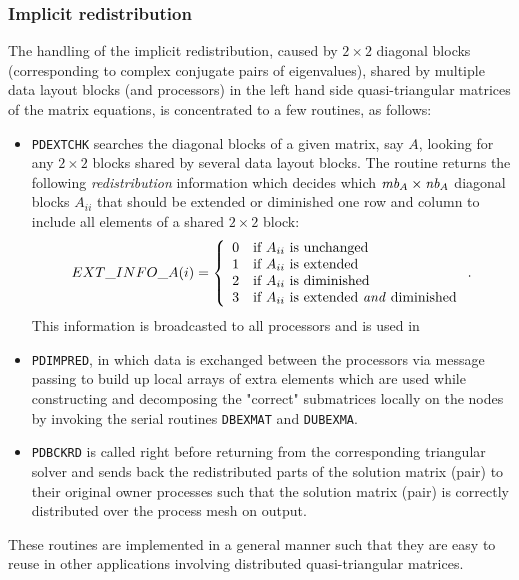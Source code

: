 \documentclass[11pt]{article}
\begin{document}
\subsubsection{Implicit redistribution}
The handling of the implicit redistribution, caused by $2 \times
2$ diagonal blocks (corresponding to complex conjugate pairs
of eigenvalues), shared by multiple data layout blocks
(and processors) in the
left hand side quasi-triangular matrices of the matrix equations,
is concentrated to a few routines, as follows:
%
\begin{itemize}
    \item \texttt{PDEXTCHK} searches the diagonal
    blocks of a given matrix, say $A$, looking for any $2 \times 2$
    blocks shared by several data layout blocks. The routine returns the
    following {\em redistribution}
    information which decides which $\mbox{\em mb}_A \times \mbox{\em
    nb}_A$ diagonal blocks $A_{ii}$ that should be extended or diminished
    one row and column to include all elements of a shared $2 \times 2$
    block:
    \begin{displaymath}
        EXT\_INFO\_A(i) =
        \left\{ \begin{array}{ll}
        0 & \textrm{if $A_{ii}$ is unchanged} \\
        1 & \textrm{if $A_{ii}$ is extended} \\
        2 & \textrm{if $A_{ii}$ is diminished} \\
        3 & \textrm{if $A_{ii}$ is extended \emph{and} diminished}
        \end{array} \right. .
    \end{displaymath}
    This information is broadcasted to all processors and is used in
    \item \texttt{PDIMPRED}, in which data is exchanged between the
    processors via message passing to build up local arrays of extra elements which
    are used while constructing and decomposing the "correct"
    submatrices locally on the nodes by invoking the serial routines
    \texttt{DBEXMAT} and \texttt{DUBEXMA}.
    \item \texttt{PDBCKRD} is called right before returning from the
    corresponding triangular solver and sends back the
    redistributed parts of the solution matrix (pair) to their original
    owner processes such that the solution matrix (pair) is
    correctly distributed over the process mesh on output.
\end{itemize}
%
These routines are implemented in a general manner such that they
are easy to reuse in other applications involving distributed
quasi-triangular matrices.
\end{document}
